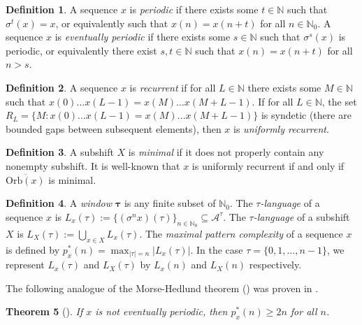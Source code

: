 \documentclass[11pt,reqno]{amsart}
\newtheorem{theorem}{Theorem}[section]
\theoremstyle{definition}
\newtheorem{definition}[theorem]{Definition}
\theoremstyle{plain}
\newcommand{\A}{\mathcal{A}}
\newcommand{\OO}{\mathrm{Orb}}
\newcommand{\N}{\mathbb{N}}
\begin{document}
\begin{definition}
    A sequence $x$ is \emph{periodic} if there exists some $t \in \N$ such that $\sigma^t(x) = x$, or equivalently such that $x(n) = x(n+t)$ for all $n \in \N_0$. A sequence $x$ is \emph{eventually periodic} if there exists some $s \in \N$ such that $\sigma^s(x)$ is periodic, or equivalently there exist $s,t \in \N$ such that $x(n) = x(n+t)$ for all $n > s$.
\end{definition}

\begin{definition}
    A sequence $x$ is \emph{recurrent} if for all $L \in \N$ there exists some $M \in \N$ such that 
    $x(0) \ldots x(L-1) = x(M) \ldots x(M+L-1)$.  If for all $L \in \N$, the set 
    $R_L=\{M: x(0) \ldots x(L-1) = x(M) \ldots x(M+L-1)\}$ is syndetic (there are bounded gaps between subsequent elements), then $x$ is \emph{uniformly recurrent}.
\end{definition}

\begin{definition}
A subshift $X$ is \emph{minimal} if it does not properly contain any nonempty subshift. It is well-known that $x$ is uniformly recurrent if and only if $\overline{\OO(x)}$ is minimal.
\end{definition}

\begin{definition}
    A \emph{window} $\boldsymbol{\tau}$ is any finite subset of $\mathbb{N}_0$. The \emph{$\tau$-language} of a sequence $x$ is $L_x(\tau) := \{(\sigma^n x)(\tau)\}_{n \in \N_0} \subseteq \A^\tau$.
    The \emph{$\tau$-language} of a subshift $X$ is $L_X(\tau) := \bigcup_{x \in X} L_x(\tau)$. The \emph{maximal pattern complexity} of a sequence $x$ is defined by $p^*_x(n) = \max_{|\tau| = n} |L_x(\tau)|$.
    In the case $\tau = \{0,1, \ldots, n-1\}$, we represent $L_x(\tau)$ and $L_X(\tau)$ by $L_x(n)$ and $L_X(n)$ respectively.%
    \end{definition}



The following analogue of the Morse-Hedlund theorem (\cite{MorseHedlund}) was proven in \cite{Kamae-Zamboni-sequence_entropy}.

\begin{theorem}[\cite{Kamae-Zamboni-sequence_entropy}]\label{KZthm}
If $x$ is not eventually periodic, then $p^*_x(n) \geq 2n$ for all $n$.
\end{theorem}
\end{document}
